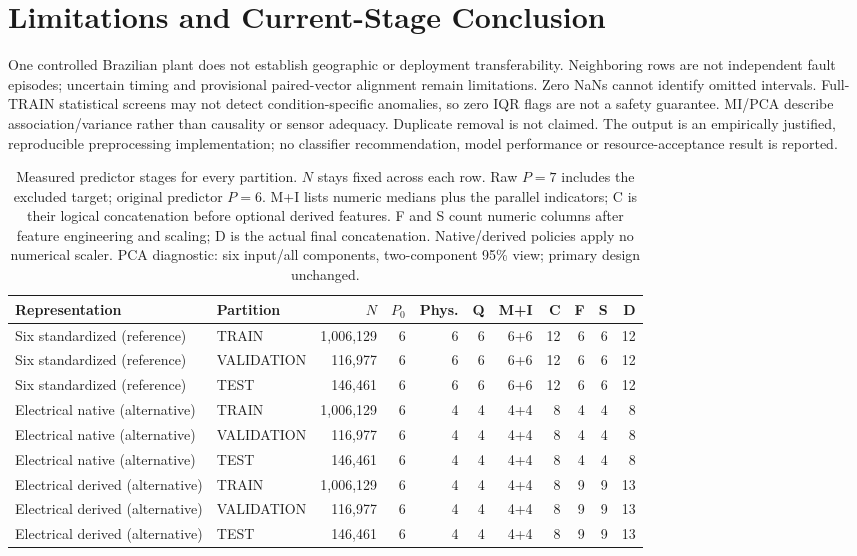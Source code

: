 \documentclass[conference]{IEEEtran}
\begin{document}
\section{Limitations and Current-Stage Conclusion}
One controlled Brazilian plant does not establish geographic or deployment transferability. Neighboring rows are not independent fault episodes; uncertain timing and provisional paired-vector alignment remain limitations. Zero NaNs cannot identify omitted intervals. Full-TRAIN statistical screens may not detect condition-specific anomalies, so zero IQR flags are not a safety guarantee. MI/PCA describe association/variance rather than causality or sensor adequacy. Duplicate removal is not claimed. The output is an empirically justified, reproducible preprocessing implementation; no classifier recommendation, model performance or resource-acceptance result is reported.
\begin{table}[!t]
\caption{Measured predictor stages for every partition. $N$ stays fixed across each row. Raw $P=7$ includes the excluded target; original predictor $P=6$. M+I lists numeric medians plus the parallel indicators; C is their logical concatenation before optional derived features. F and S count numeric columns after feature engineering and scaling; D is the actual final concatenation. Native/derived policies apply no numerical scaler. PCA diagnostic: six input/all components, two-component 95\% view; primary design unchanged.}\label{tab:dimensions}
\centering\footnotesize
\begin{tabularx}{\textwidth}{YYrrrrrrrrr}
\toprule
Representation & Partition & $N$ & $P_0$ & Phys. & Q & M+I & C & F & S & D \\ \midrule
Six standardized (reference) & TRAIN & 1,006,129 & 6 & 6 & 6 & 6+6 & 12 & 6 & 6 & 12 \\
Six standardized (reference) & VALIDATION & 116,977 & 6 & 6 & 6 & 6+6 & 12 & 6 & 6 & 12 \\
Six standardized (reference) & TEST & 146,461 & 6 & 6 & 6 & 6+6 & 12 & 6 & 6 & 12 \\
Electrical native (alternative) & TRAIN & 1,006,129 & 6 & 4 & 4 & 4+4 & 8 & 4 & 4 & 8 \\
Electrical native (alternative) & VALIDATION & 116,977 & 6 & 4 & 4 & 4+4 & 8 & 4 & 4 & 8 \\
Electrical native (alternative) & TEST & 146,461 & 6 & 4 & 4 & 4+4 & 8 & 4 & 4 & 8 \\
Electrical derived (alternative) & TRAIN & 1,006,129 & 6 & 4 & 4 & 4+4 & 8 & 9 & 9 & 13 \\
Electrical derived (alternative) & VALIDATION & 116,977 & 6 & 4 & 4 & 4+4 & 8 & 9 & 9 & 13 \\
Electrical derived (alternative) & TEST & 146,461 & 6 & 4 & 4 & 4+4 & 8 & 9 & 9 & 13 \\
\bottomrule
\end{tabularx}
\end{table}
\end{document}
